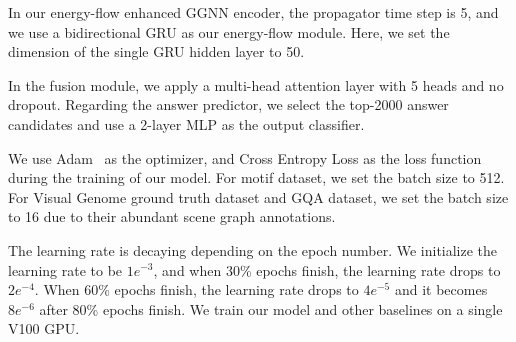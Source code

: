 \documentclass[letterpaper]{article} %
\begin{document}
In our energy-flow enhanced GGNN encoder, the propagator time step is 5, and we use a bidirectional GRU as our energy-flow module. 
Here, we set the dimension of the single GRU hidden layer to 50. 

In the fusion module, we apply a multi-head attention layer with 5 heads and no dropout. 
Regarding the answer predictor, we select the top-2000 answer candidates and use a 2-layer MLP as the output classifier.

We use Adam~\cite{kingma2014adam} as the optimizer, and Cross Entropy Loss as the loss function during the training of our model. 
For motif dataset, we set the batch size to 512. For Visual Genome ground truth dataset and GQA dataset, we set the batch size to 16 due to their abundant scene graph annotations.

The learning rate is decaying depending on the epoch number. We initialize the learning rate to be $1e^{-3}$, and when 30\% epochs finish, the learning rate drops to $2e^{-4}$. When 60\% epochs finish, the learning rate drops to $4e^{-5}$ and it becomes $8e^{-6}$ after 80\% epochs finish. We train our model and other baselines on a single V100 GPU.

\end{document}
